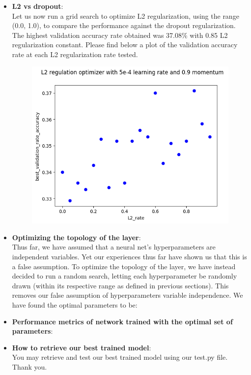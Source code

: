 \begin{itemize}[topsep=-13pt]
\item \textbf{L2 vs dropout}:\\
  Let us now run a grid search to optimize L2 regularization,
  using the range (0.0, 1.0), to compare the performance against the dropout regularization.
  The highest validation accuracy rate obtained was 37.08\% with 0.85 L2 regularization constant.
  Please find below a plot of the validation accuracy rate at each L2 regularization rate tested.
  \begin{figure}[!ht]
    \centering
        {{\includegraphics[scale = 0.50]{../src/optimizers/outputs/grid_search/L2_rate.png}}}
  \end{figure}

  
\item \textbf{Optimizing the topology of the layer}:\\
  Thus far, we have assumed that a neural net's hyperparameters are independent variables.
  Yet our experiences thus far have shown us that this is a false assumption.
  To optimize the topology of the layer, we have instead decided to run a random search,
  letting each hyperparameter be randomly drawn (within its respective range as defined in previous sections).
  This removes our false assumption of hyperparameters variable independence.
  We have found the optimal parameters to be:
  
\item \textbf{Performance metrics of network trained with the optimal set of parameters}:\\
  

  
\item \textbf{How to retrieve our best trained model}:\\
  You may retrieve and test our best trained model using our test.py file.
  Thank you.
\end{itemize}
  
